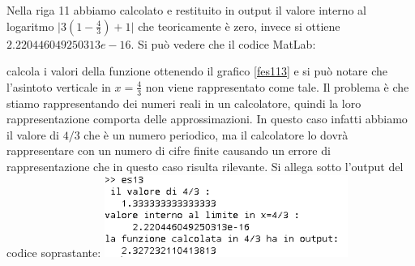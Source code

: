 Nella riga 11 abbiamo calcolato e restituito in output il valore interno al logaritmo $\big|3(1-\frac{4}{3})+1\big|$ che teoricamente è zero, invece si ottiene $2.220446049250313e-16 $. 
Si può vedere che il codice MatLab:

calcola i valori della funzione ottenendo il grafico \ref{fes113} e si può notare che l'asintoto verticale in $x=\frac{4}{3}$ non viene rappresentato come tale. \newline Il problema è che stiamo rappresentando dei numeri reali in un calcolatore, quindi la loro rappresentazione comporta delle approssimazioni. In questo caso infatti abbiamo il valore di $4/3$ che è un numero periodico, ma il calcolatore lo dovrà rappresentare con un numero di cifre finite causando un errore di rappresentazione che in questo caso risulta rilevante. Si allega sotto l'output del codice soprastante:
\newline
\newline
\includegraphics[width=300px]{cap_1/es13/es113.png}